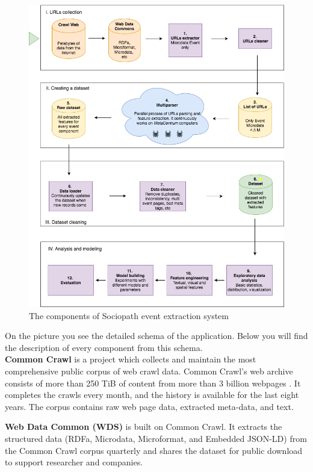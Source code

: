 \begin{figure}[h]
\begin{center}
\includegraphics[width=1.0\textwidth]{figures04/Architecure}
\caption{The components of Sociopath event extraction system}
\label{fig:architecture}
\end{center}
\end{figure}

On the picture  you see the detailed schema of the application. Below you will find the description of every component from this schema.\\

\textbf{Common Crawl} is a project which collects and maintain the most comprehensive public corpus of web crawl data. Common Crawl's web archive consists of more than 250 TiB of content from more than 3 billion webpages \cite{commoncrawl}. It completes the crawls every month, and the history is available for the last eight years. The corpus contains raw web page data, extracted meta-data, and text.

\textbf{Web Data Common (WDS)}\cite{webdatacommons} is built on Common Crawl. It extracts the structured data (RDFa, Microdata, Microformat, and Embedded JSON-LD) from the Common Crawl corpus quarterly and shares the dataset for public download to support researcher and companies. 


